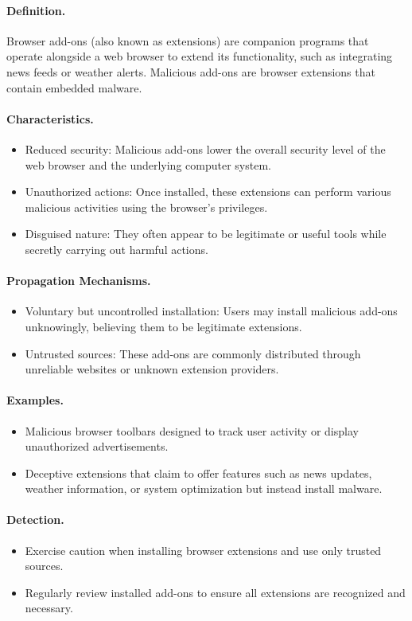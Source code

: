 \paragraph{Definition.}
Browser add-ons (also known as extensions) are companion programs that operate alongside a web browser to extend its functionality, such as integrating news feeds or weather alerts. Malicious add-ons are browser extensions that contain embedded malware.

\paragraph{Characteristics.}
\begin{itemize}
  \item Reduced security: Malicious add-ons lower the overall security level of the web browser and the underlying computer system.
  \item Unauthorized actions: Once installed, these extensions can perform various malicious activities using the browser's privileges.
  \item Disguised nature: They often appear to be legitimate or useful tools while secretly carrying out harmful actions.
\end{itemize}

\paragraph{Propagation Mechanisms.}
\begin{itemize}
  \item Voluntary but uncontrolled installation: Users may install malicious add-ons unknowingly, believing them to be legitimate extensions.
  \item Untrusted sources: These add-ons are commonly distributed through unreliable websites or unknown extension providers.
\end{itemize}

\paragraph{Examples.}
\begin{itemize}
  \item Malicious browser toolbars designed to track user activity or display unauthorized advertisements.
  \item Deceptive extensions that claim to offer features such as news updates, weather information, or system optimization but instead install malware.
\end{itemize}

\paragraph{Detection.}
\begin{itemize}
  \item Exercise caution when installing browser extensions and use only trusted sources.
  \item Regularly review installed add-ons to ensure all extensions are recognized and necessary.
\end{itemize}
